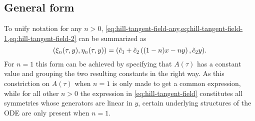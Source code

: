\subsection{General form}

To unify notation for any \(n>0\), \cref{eq:hill-tangent-field-any,eq:hill-tangent-field-1,eq:hill-tangent-field-2} can be summarized as
\begin{equation} \label{eq:hill-tangent-field}
  \pqty{\xi_n(\tau,y),\eta_n(\tau,y)} = 
  \pqty{\tilde{c}_1 + \tilde{c}_2 \left( (1-n) x - n y \right), \tilde{c}_2 y}.
\end{equation}
For \(n=1\) this form can be achieved by specifying that \(A(\tau)\) has a constant value and grouping the two resulting constants in the right way.
As this constriction on \(A(\tau)\) when \(n=1\) is only made to get a common expression, while for all other \(n>0\) the expression in \cref{eq:hill-tangent-field} constitutes all symmetries whose generators are linear in \(y\), certain underlying structures of the ODE are only present when \(n=1\). %
